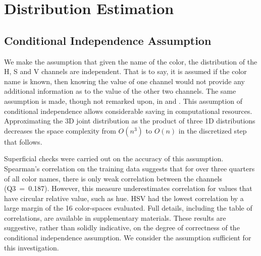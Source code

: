 \documentclass[11pt,a4paper]{article}
\newcommand{\textcite}{\citet}
\begin{document}
\section{Distribution Estimation}
\subsection{Conditional Independence Assumption}\label{sec:conditional-independence-assumption}
We make the assumption that given the name of the color, the distribution of the H, S and V channels are independent.
That is to say, it is assumed if the color name is known, then  knowing the value of one channel would not provide any additional information as to the value of the other two channels.
The same assumption is made, though not remarked upon, in \textcite{meomcmahanstone:color} and \textcite{mcmahan2015bayesian}.
This assumption of conditional independence allows considerable saving in computational resources.
Approximating the 3D joint distribution as the product of three 1D distributions decreases the space complexity from $O(n^3)$ to $O(n)$ in the discretized step that follows.

Superficial checks were carried out on the accuracy of this assumption.
Spearman's correlation on the training data suggests that for over three quarters of all color names, there is only weak correlation between the channels (\mbox{Q3 = 0.187}).
However, this measure underestimates correlation for values that have circular relative value, such as hue.
HSV had the lowest correlation by a large margin of the 16 color-spaces evaluated.
Full details, including the table of correlations, are available in supplementary materials.
These results are suggestive, rather than solidly indicative, on the degree of correctness of the conditional independence assumption.
We consider the assumption sufficient for this investigation.
\end{document}

